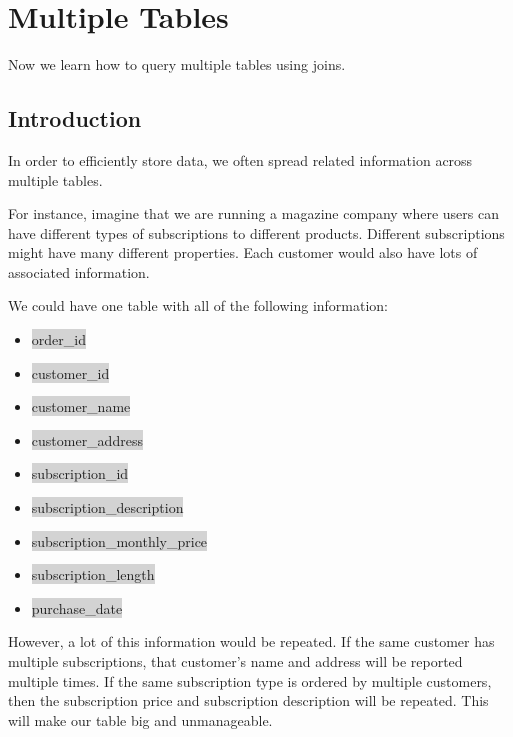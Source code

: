 \documentclass[11pt]{article}
\begin{document}
{{\newpage
\section{Multiple Tables}
Now we learn how to query multiple tables using joins.
\subsection{Introduction}
In order to efficiently store data, we often spread related information across multiple tables.

For instance, imagine that we are running a magazine company where users can have different types of subscriptions to different products. Different subscriptions might have many different properties. Each customer would also have lots of associated information.

We could have one table with all of the following information:
\begin{itemize}[leftmargin = *]
\item \colorbox{lightgray}{order\_id}
\item \colorbox{lightgray}{customer\_id}
\item \colorbox{lightgray}{customer\_name}
\item \colorbox{lightgray}{customer\_address}
\item \colorbox{lightgray}{subscription\_id}
\item \colorbox{lightgray}{subscription\_description}
\item \colorbox{lightgray}{subscription\_monthly\_price}
\item \colorbox{lightgray}{subscription\_length}
\item \colorbox{lightgray}{purchase\_date}
\end{itemize}
However, a lot of this information would be repeated. If the same customer has multiple subscriptions, that customer’s name and address will be reported multiple times. If the same subscription type is ordered by multiple customers, then the subscription price and subscription description will be repeated. This will make our table big and unmanageable.

}}
\end{document}
